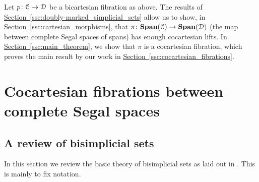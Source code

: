 \documentclass[main.tex]{subfiles}
\begin{document}
Let $p\colon \mathcal{C} \to \mathcal{D}$ be a bicartesian fibration as above. The results of \hyperref[ssc:doubly-marked_simplicial_sets]{Section~\ref*{ssc:doubly-marked_simplicial_sets}} allow us to show, in \hyperref[ssc:cartesian_morphisms]{Section~\ref*{ssc:cartesian_morphisms}}, that $\pi\colon \mathbf{Span}(\mathcal{C}) \to \mathbf{Span}(\mathcal{D})$ (the map between complete Segal spaces of spans) has enough cocartesian lifts. In \hyperref[ssc:main_theorem]{Section~\ref*{ssc:main_theorem}}, we show that $\pi$ is a cocartesian fibration, which proves the main result by our work in \hyperref[ssc:cocartesian_fibrations]{Section~\ref*{ssc:cocartesian_fibrations}}.


\section{Cocartesian fibrations between complete Segal spaces}
\label{sec:cocartesian_fibrations_between_complete_segal_spaces}

\subsection{A review of bisimplicial sets}
\label{ssc:a_review_of_bisimplicial_sets}

In this section we review the basic theory of bisimplicial sets as laid out in \cite{qcats_vs_segal_spaces}. This is mainly to fix notation.
\end{document}

